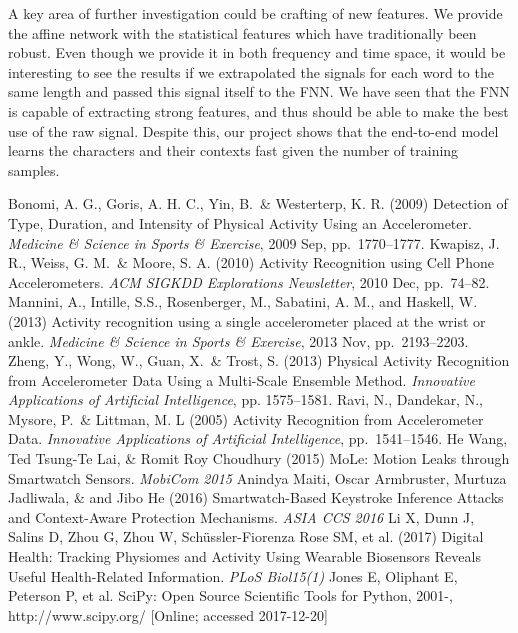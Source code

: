 \documentclass[10pt,twocolumn,letterpaper]{article}
\begin{document}
A key area of further investigation could be crafting of new features. We provide the affine network with the statistical features which have traditionally been robust. Even though we provide it in both frequency and time space, it would be interesting to see the results if we extrapolated the signals for each word to the same length and passed this signal itself to the FNN. We have seen that the FNN is capable of extracting strong features, and thus should be able to make the best use of the raw signal. Despite this, our project shows that the end-to-end model learns the characters and their contexts fast given the number of training samples.

\begin{thebibliography}{1}
  \small
    Bonomi, A. G., Goris, A. H. C., Yin, B.\ \& Westerterp, K. R. (2009) Detection of Type, Duration, and Intensity of Physical Activity Using an Accelerometer. {\it Medicine \& Science in Sports \& Exercise}, 2009 Sep, pp.\ 1770--1777.
   Kwapisz, J. R., Weiss, G. M.\ \& Moore, S. A. (2010) Activity Recognition using Cell Phone Accelerometers. {\it ACM SIGKDD Explorations Newsletter}, 2010 Dec, pp.\ 74--82.
   Mannini, A., Intille, S.S., Rosenberger, M., Sabatini, A. M., and Haskell, W. (2013) Activity recognition using a single accelerometer placed at the wrist or ankle. {\it Medicine \& Science in Sports \& Exercise}, 2013 Nov, pp.\ 2193--2203.
   Zheng, Y., Wong, W., Guan, X.\ \& Trost, S. (2013) Physical Activity Recognition from Accelerometer Data Using a Multi-Scale Ensemble Method. {\it Innovative Applications of Artificial Intelligence}, pp. 1575--1581.
   Ravi, N., Dandekar, N., Mysore, P.\ \& Littman, M. L (2005) Activity Recognition from Accelerometer Data. {\it Innovative Applications of Artificial Intelligence}, pp.\ 1541--1546.
   He Wang, Ted Tsung-Te Lai, \& Romit Roy Choudhury (2015) MoLe: Motion Leaks through Smartwatch Sensors. {\it MobiCom 2015}
   Anindya Maiti, Oscar Armbruster, Murtuza Jadliwala, \& and Jibo He (2016) Smartwatch-Based Keystroke Inference Attacks and
Context-Aware Protection Mechanisms. {\it ASIA CCS 2016}
   Li X, Dunn J, Salins D, Zhou G, Zhou W, Schüssler-Fiorenza Rose SM, et al. (2017) Digital Health: Tracking Physiomes and Activity Using Wearable Biosensors Reveals Useful Health-Related Information. {\it PLoS Biol15(1)}
   Jones E, Oliphant E, Peterson P, et al. SciPy: Open Source Scientific Tools for Python, 2001-, http://www.scipy.org/ [Online; accessed 2017-12-20]

\end{thebibliography}
\end{document}
